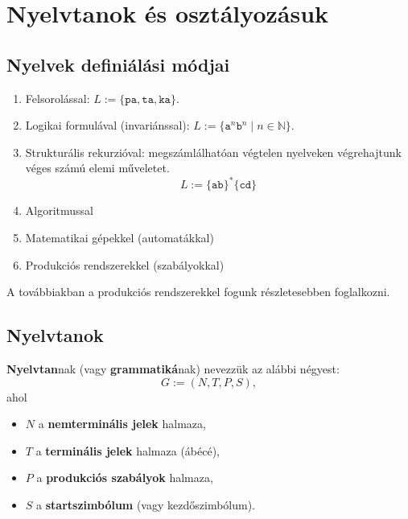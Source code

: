 \chapter{Nyelvtanok és osztályozásuk}

\section{Nyelvek definiálási módjai}

\begin{enumerate}
	\item Felsorolással: $ L := \{ \texttt{pa}, \texttt{ta}, \texttt{ka} \} $.
	\item Logikai formulával (invariánssal):
	$ L := \{ \texttt{a}^n\texttt{b}^n \mid n \in \mathbb{N} \} $.
	\item Strukturális rekurzióval: megszámlálhatóan végtelen nyelveken végrehajtunk véges számú elemi műveletet. \[ L := \{ \texttt{ab}\}^* \{ \texttt{cd} \}^{} \]
	\item Algoritmussal
	\item Matematikai gépekkel (automatákkal)
	\item Produkciós rendszerekkel (szabályokkal)
\end{enumerate}

A továbbiakban a produkciós rendszerekkel fogunk részletesebben foglalkozni.

\section{Nyelvtanok}

\begin{tcolorbox}
	\begin{definition}[Nyelvtan]
		\textbf{Nyelvtan}nak (vagy \textbf{grammatiká}nak) nevezzük az alábbi négyest:
		\[ G := ( N, T, P, S), \] ahol
		\begin{itemize}
			\item $N$ a \textbf{nemterminális jelek} halmaza,
			\item $T$ a \textbf{terminális jelek} halmaza (ábécé),
			\item $P$ a \textbf{produkciós szabályok} halmaza,
			\item $S$ a \textbf{startszimbólum} (vagy kezdőszimbólum).
		\end{itemize}
	\end{definition}
\end{tcolorbox}


